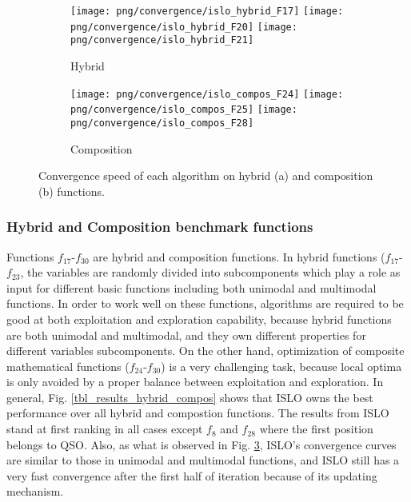 \documentclass[../main.tex]{subfiles}
\begin{document}
\begin{figure}[!ht] 
   \centering
   \begin{subfigure}{0.49\textwidth}
   	\texttt{[image: png/convergence/islo\_hybrid\_F17]}
  	 \texttt{[image: png/convergence/islo\_hybrid\_F20]}
  	 \texttt{[image: png/convergence/islo\_hybrid\_F21]}
  	\caption{Hybrid}
  	\label{subfig:hybrid_convergence}
  	\end{subfigure}
   \begin{subfigure}{0.49\textwidth}
   	\texttt{[image: png/convergence/islo\_compos\_F24]}
  	 \texttt{[image: png/convergence/islo\_compos\_F25]}
  	 \texttt{[image: png/convergence/islo\_compos\_F28]}
  	 \caption{Composition}
  	\label{subfig:compos_convergence}
  	\end{subfigure}
  \caption{Convergence speed of each algorithm on hybrid (a) and composition (b) functions.} 
  \label{fig_hybrid_compos_convergence} 
\end{figure}
\subsubsection{Hybrid and Composition benchmark functions}

	Functions $f_{17}$-$f_{30}$ are hybrid and composition functions. In hybrid functions ($f_{17}$-$f_{23}$, the variables are randomly divided into subcomponents which play a role as input for different basic functions including both unimodal and multimodal functions. In order to work well on these functions, algorithms are required to be good at both exploitation and exploration capability, because hybrid functions are both unimodal and multimodal, and they own different properties for different variables subcomponents. On the other hand, optimization of composite mathematical functions ($f_{24}$-$f_{30}$) is a very challenging task, because local optima is only avoided by a proper balance between exploitation and exploration. In general, Fig. \ref{tbl_results_hybrid_compos} shows that ISLO owns the best performance over all hybrid and compostion functions. The results from ISLO stand at first ranking in all cases except $f_8$ and $f_{28}$ where the first position belongs to QSO. Also, as what is observed in Fig. \ref{fig_hybrid_compos_convergence}, ISLO's convergence curves are similar to those in unimodal and multimodal functions, and ISLO still has a very fast convergence after the first half of iteration because of its updating mechanism.
	
\end{document}
